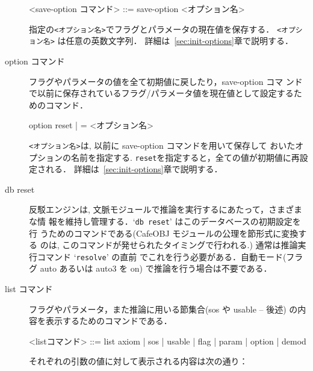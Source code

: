 \begin{description}
\begin{vvtm}
\begin{simplev}
   <save-option コマンド> ::= save-option <オプション名>
\end{simplev}
\end{vvtm}

指定の\texttt{<オプション名>}でフラグとパラメータの現在値を保存する．
  \texttt{<オプション名>} は任意の英数文字列．
  詳細は~\ref{sec:init-options}章で説明する．

\item[option コマンド]

  フラグやパラメータの値を全て初期値に戻したり，save-option コマ
  ンドで以前に保存されているフラグ/パラメータ値を現在値として設定するた
  めのコマンド．

\begin{vvtm}
\begin{simplev}
    option { reset | = <オプション名> }
\end{simplev}
\end{vvtm}

  \texttt{<オプション名>}は, 以前に save-option コマンドを用いて保存して
  おいたオプションの名前を指定する.
  \texttt{reset}を指定すると，全ての値が初期値に再設定される．
  詳細は~\ref{sec:init-options}章で説明する．

\item[db reset]

  反駁エンジンは, 文脈モジュールで推論を実行するにあたって，さまざまな情
  報を維持し管理する．`\texttt{db reset}' はこのデータベースの初期設定を行
  うためのコマンドである(CafeOBJ モジュールの公理を節形式に変換する
  のは, このコマンドが発せられたタイミングで行われる.)
  通常は推論実行コマンド `\texttt{resolve}' の直前
  でこれを行う必要がある．自動モード(フラグ auto あるいは auto3 を on)
  で推論を行う場合は不要である．

\item[list コマンド]

  フラグやパラメータ，また推論に用いる節集合(sos や usable -- 後述) の内
  容を表示するためのコマンドである．

\begin{vvtm}
\begin{simplev}
   <listコマンド> ::= list { axiom | sos | usable | flag | 
                             param | option | demod }
\end{simplev}
\end{vvtm}

それぞれの引数の値に対して表示される内容は次の通り：


\end{description}
